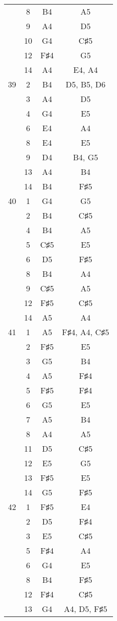 \documentclass{article}
\begin{document}
\begin{longtable}{|c|c|c|c|}
  & 8 & B4 & A5 \\ 
  & 9 & A4 & D5 \\ 
  & 10 & G4 & C♯5 \\ 
  & 12 & F♯4 & G5 \\ 
  & 14 & A4 & E4, A4 \\ 
\hline
39 & 2 & B4 & D5, B5, D6 \\ 
  & 3 & A4 & D5 \\ 
  & 4 & G4 & E5 \\ 
  & 6 & E4 & A4 \\ 
  & 8 & E4 & E5 \\ 
  & 9 & D4 & B4, G5 \\ 
  & 13 & A4 & B4 \\ 
  & 14 & B4 & F♯5 \\ 
\hline
40 & 1 & G4 & G5 \\ 
  & 2 & B4 & C♯5 \\ 
  & 4 & B4 & A5 \\ 
  & 5 & C♯5 & E5 \\ 
  & 6 & D5 & F♯5 \\ 
  & 8 & B4 & A4 \\ 
  & 9 & C♯5 & A5 \\ 
  & 12 & F♯5 & C♯5 \\ 
  & 14 & A5 & A4 \\ 
\hline
41 & 1 & A5 & F♯4, A4, C♯5 \\ 
  & 2 & F♯5 & E5 \\ 
  & 3 & G5 & B4 \\ 
  & 4 & A5 & F♯4 \\ 
  & 5 & F♯5 & F♯4 \\ 
  & 6 & G5 & E5 \\ 
  & 7 & A5 & B4 \\ 
  & 8 & A4 & A5 \\ 
  & 11 & D5 & C♯5 \\ 
  & 12 & E5 & G5 \\ 
  & 13 & F♯5 & E5 \\ 
  & 14 & G5 & F♯5 \\ 
\hline
42 & 1 & F♯5 & E4 \\ 
  & 2 & D5 & F♯4 \\ 
  & 3 & E5 & C♯5 \\ 
  & 5 & F♯4 & A4 \\ 
  & 6 & G4 & E5 \\ 
  & 8 & B4 & F♯5 \\ 
  & 12 & F♯4 & C♯5 \\ 
  & 13 & G4 & A4, D5, F♯5 \\ 

\end{longtable}
\end{document}
